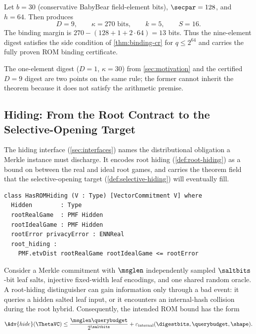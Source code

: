 \begin{finding}\label{finding:capstone}
Let $b=30$ (conservative BabyBear field-element bits), $\secpar=128$, and
$h=64$.  Then  produces
\[
  D=9,\qquad \kappa=270\text{ bits},\qquad k=5,\qquad S=16.
\]
The binding margin is
$270-(128+1+2\cdot64)=13$ bits.  Thus the nine-element digest satisfies the
side condition of \cref{thm:binding-cr} for $q\le2^{64}$ and carries the
fully proven ROM binding certificate.
\end{finding}

The one-element digest ($D=1$, $\kappa=30$) from \cref{sec:motivation} and
the certified $D=9$ digest are two points on the same rule; the former cannot
inherit the theorem because it does not satisfy the arithmetic premise.



\subsection{Hiding: From the Root Contract to the Selective-Opening Target}
\label{sec:hiding}

The hiding interface (\cref{sec:interfaces}) names the distributional
obligation a Merkle instance must discharge.  It encodes root hiding
(\cref{def:root-hiding}) as a bound on  between the real and
ideal root games, and carries the theorem field that the selective-opening
target (\cref{def:selective-hiding}) will eventually fill.
\begin{verbatim}
class HasROMHiding (V : Type) [VectorCommitment V] where
  Hidden        : Type
  rootRealGame  : PMF Hidden
  rootIdealGame : PMF Hidden
  rootError privacyError : ENNReal
  root_hiding :
    PMF.etvDist rootRealGame rootIdealGame <= rootError
\end{verbatim}

\begin{proposition}\label{thm:hiding-rom}
Consider a Merkle commitment with $\msglen$ independently sampled
$\saltbits$-bit leaf salts, injective fixed-width leaf encodings, and one
shared random oracle.  A root-hiding distinguisher can gain information only
through a bad event: it queries a hidden salted leaf input, or it encounters an
internal-hash collision during the root hybrid.  Consequently, the intended
ROM bound has the form
\[
  \Adv{hide}(\ThetaVC)
  \le
  \frac{\msglen\querybudget}{2^{\saltbits}}
  + \varepsilon_{\mathrm{internal}}(\digestbits,\querybudget,\shape).
\]
\end{proposition}

